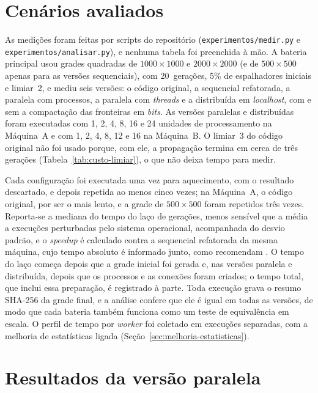\section{Cenários avaliados}

As medições foram feitas por scripts do repositório (\texttt{experimentos/medir.py} e \texttt{experimentos/analisar.py}), e nenhuma tabela foi preenchida à mão. A bateria principal usou grades quadradas de $1000 \times 1000$ e $2000 \times 2000$ (e de $500 \times 500$ apenas para as versões sequenciais), com 20~gerações, 5\% de espalhadores iniciais e limiar~2, e mediu seis versões: o código original, a sequencial refatorada, a paralela com processos, a paralela com \textit{threads} e a distribuída em \textit{localhost}, com e sem a compactação das fronteiras em \textit{bits}. As versões paralelas e distribuídas foram executadas com 1, 2, 4, 8, 16 e 24 unidades de processamento na Máquina~A e com 1, 2, 4, 8, 12 e 16 na Máquina~B. O limiar~3 do código original não foi usado porque, com ele, a propagação termina em cerca de três gerações (Tabela~\ref{tab:custo-limiar}), o que não deixa tempo para medir.

Cada configuração foi executada uma vez para aquecimento, com o resultado descartado, e depois repetida ao menos cinco vezes; na Máquina~A, o código original, por ser o mais lento, e a grade de $500 \times 500$ foram repetidos três vezes. Reporta-se a mediana do tempo do laço de gerações, menos sensível que a média a execuções perturbadas pelo sistema operacional, acompanhada do desvio padrão, e o \textit{speedup} é calculado contra a sequencial refatorada da mesma máquina, cujo tempo absoluto é informado junto, como recomendam . O tempo do laço começa depois que a grade inicial foi gerada e, nas versões paralela e distribuída, depois que os processos e as conexões foram criados; o tempo total, que inclui essa preparação, é registrado à parte. Toda execução grava o resumo SHA-256 da grade final, e a análise confere que ele é igual em todas as versões, de modo que cada bateria também funciona como um teste de equivalência em escala. O perfil de tempo por \textit{worker} foi coletado em execuções separadas, com a melhoria de estatísticas ligada (Seção~\ref{sec:melhoria-estatisticas}).


\section{Resultados da versão paralela}


